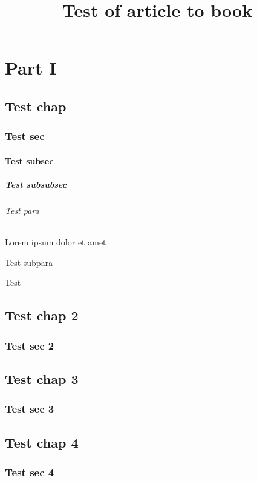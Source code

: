 \documentclass{article}
\title{Test of article to book}
\begin{document}
    \frontmatter
    \tableofcontents
    
    \part{Part I}
    \chapter{Test chap}
    \section{Test sec}
    \subsection{Test subsec}
    \subsubsection{Test subsubsec}
    \paragraph{Test para} Lorem ipsum dolor et amet
    \subparagraph{Test subpara}
    Test
    \chapter{Test chap 2}
    \section{Test sec 2}

    \mainmatter
    \chapter{Test chap 3}
    \section{Test sec 3}
    
    \chapter{Test chap 4}
    \section{Test sec 4}
    
\end{document}
